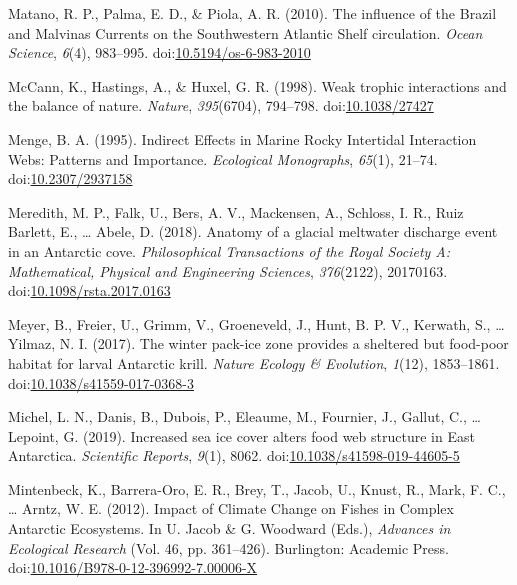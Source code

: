 \documentclass[
]{article}
\newlength{\cslhangindent}
\newlength{\cslentryspacingunit} %
\newenvironment{CSLReferences}[2] %
 {%
  \setlength{\parindent}{0pt}
  \ifodd #1
  \let\oldpar\par
  \def\par{\hangindent=\cslhangindent\oldpar}
  \fi
  \setlength{\parskip}{#2\cslentryspacingunit}
 }%
 {}
\begin{document}
\begin{CSLReferences}{1}{0}
\leavevmode{}%
Matano, R. P., Palma, E. D., \& Piola, A. R. (2010). The influence of
the {Brazil} and {Malvinas Currents} on the {Southwestern Atlantic
Shelf} circulation. \emph{Ocean Science}, \emph{6}(4), 983--995.
doi:\href{https://doi.org/10.5194/os-6-983-2010}{10.5194/os-6-983-2010}

\leavevmode{}%
McCann, K., Hastings, A., \& Huxel, G. R. (1998). Weak trophic
interactions and the balance of nature. \emph{Nature}, \emph{395}(6704),
794--798. doi:\href{https://doi.org/10.1038/27427}{10.1038/27427}

\leavevmode{}%
Menge, B. A. (1995). Indirect {Effects} in {Marine Rocky Intertidal
Interaction Webs}: {Patterns} and {Importance}. \emph{Ecological
Monographs}, \emph{65}(1), 21--74.
doi:\href{https://doi.org/10.2307/2937158}{10.2307/2937158}

\leavevmode{}%
Meredith, M. P., Falk, U., Bers, A. V., Mackensen, A., Schloss, I. R.,
Ruiz Barlett, E., \ldots{} Abele, D. (2018). Anatomy of a glacial
meltwater discharge event in an {Antarctic} cove. \emph{Philosophical
Transactions of the Royal Society A: Mathematical, Physical and
Engineering Sciences}, \emph{376}(2122), 20170163.
doi:\href{https://doi.org/10.1098/rsta.2017.0163}{10.1098/rsta.2017.0163}

\leavevmode{}%
Meyer, B., Freier, U., Grimm, V., Groeneveld, J., Hunt, B. P. V.,
Kerwath, S., \ldots{} Yilmaz, N. I. (2017). The winter pack-ice zone
provides a sheltered but food-poor habitat for larval {Antarctic} krill.
\emph{Nature Ecology \& Evolution}, \emph{1}(12), 1853--1861.
doi:\href{https://doi.org/10.1038/s41559-017-0368-3}{10.1038/s41559-017-0368-3}

\leavevmode{}%
Michel, L. N., Danis, B., Dubois, P., Eleaume, M., Fournier, J., Gallut,
C., \ldots{} Lepoint, G. (2019). Increased sea ice cover alters food web
structure in {East Antarctica}. \emph{Scientific Reports}, \emph{9}(1),
8062.
doi:\href{https://doi.org/10.1038/s41598-019-44605-5}{10.1038/s41598-019-44605-5}

\leavevmode{}%
Mintenbeck, K., Barrera-Oro, E. R., Brey, T., Jacob, U., Knust, R.,
Mark, F. C., \ldots{} Arntz, W. E. (2012). Impact of {Climate Change} on
{Fishes} in {Complex Antarctic Ecosystems}. In U. Jacob \& G. Woodward
(Eds.), \emph{Advances in {Ecological Research}} (Vol. 46, pp.
361--426). {Burlington}: {Academic Press}.
doi:\href{https://doi.org/10.1016/B978-0-12-396992-7.00006-X}{10.1016/B978-0-12-396992-7.00006-X}


\end{CSLReferences}
\end{document}
